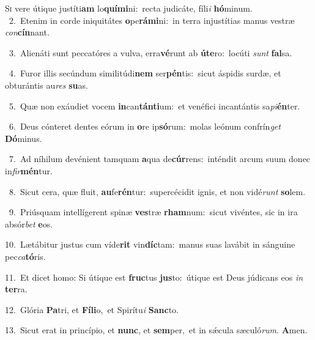 \lettrine{\initial\textcolor{\initialcolor}{S}}{i} vere útique justíti\textbf{am} lo\-\textbf{quí}\-\textbf{mi}ni:~\star recta judicáte, fíli\textit{i} \textbf{hó}\-minum.\\
{\numbfont\textcolor{\numbcolor}{~2.}}~Etenim in corde iniquitátes \textbf{o}\-pe\-\textbf{rá}\-\textbf{mi}ni:~\star in terra injustítias manus vestræ \textit{con}\-\textbf{cín}nant.\par
{\numbfont\textcolor{\numbcolor}{~3.}}~Alienáti sunt peccatóres a vulva, erra\-\textbf{vé}\-runt ab \textbf{ú}\-\textbf{te}ro:~\star locúti \textit{sunt} \textbf{fal}\-sa.\par
{\numbfont\textcolor{\numbcolor}{~4.}}~Furor illis secúndum similitúdi\textbf{nem} ser\-\textbf{pén}\-tis:~\star sicut áspidis surdæ, et obturántis au\textit{res} \textbf{su}\-as.\par
{\numbfont\textcolor{\numbcolor}{~5.}}~Quæ non exáudiet vocem \textbf{in}\-can\-\textbf{tán}\-\textbf{ti}um:~\star et venéfici incantántis sa\-\textit{pi}\-\textbf{én}ter.\par
{\numbfont\textcolor{\numbcolor}{~6.}}~Deus cónteret dentes eórum in \textbf{o}\-re ip\-\textbf{só}\-rum:~\star molas leónum confrín\textit{get} \textbf{Dó}\-minus.\par
{\numbfont\textcolor{\numbcolor}{~7.}}~Ad níhilum devénient tamquam \textbf{a}\-qua de\-\textbf{cúr}\-rens:~\star inténdit arcum suum donec in\-\textit{fir}\-\textbf{mén}tur.\par
{\numbfont\textcolor{\numbcolor}{~8.}}~Sicut cera, quæ fluit, \textbf{au}\-fe\-\textbf{rén}\-tur:~\star supercécidit ignis, et non vidé\textit{runt} \textbf{so}\-lem.\par
{\numbfont\textcolor{\numbcolor}{~9.}}~Priúsquam intellígerent spinæ \textbf{ves}\-træ \textbf{rham}\-num:~\star sicut vivéntes, sic in ira absór\textit{bet} \textbf{e}\-os.\par
{\numbfont\textcolor{\numbcolor}{10.}}~Lætábitur justus cum víde\textbf{rit} vin\-\textbf{díc}\-tam:~\star manus suas lavábit in sánguine pec\-\textit{ca}\-\textbf{tó}ris.\par
{\numbfont\textcolor{\numbcolor}{11.}}~Et dicet homo: Si útique est \textbf{fruc}\-tus \textbf{jus}\-to:~\star útique est Deus júdicans eos \textit{in} \textbf{ter}\-ra.\par
{\numbfont\textcolor{\numbcolor}{12.}}~Glória \textbf{Pa}\-tri, et \textbf{Fí}\-\textbf{li}o,~\star et Spirítu\textit{i} \textbf{Sanc}\-to.\par
{\numbfont\textcolor{\numbcolor}{13.}}~Sicut erat in princípio, et \textbf{nunc}\-, et \textbf{sem}\-per,~\star et in sǽcula sæculó\-\textit{rum}\-. \textbf{A}\-men.\par
